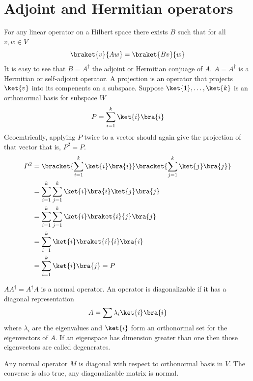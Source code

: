 \section{Adjoint and Hermitian operators}
For any linear operator on a Hilbert space there exists \(B\) such that for all \(v,w\in V\) 
\begin{equation*}
    \braket{v}{Aw} = \braket{Bv}{w}
\end{equation*}
It is easy to see that \(B = A^{\dagger}\) the adjoint or Hermitian conjuage of \(A\). \(A = A^{\dagger}\) is a Hermitian or self-adjoint operator. A projection is an operator that projects \(\ket{v}\) into its compenents on a subspace. Suppose \(\ket{1} , \dots , \ket{k}\) is an orthonormal basis for subspace \(W\) 
\begin{equation*}
    P = \sum_{i = 1}^k \ket{i} \bra{i}
\end{equation*}
Geoemtrically, applying \(P\) twice to a vector should again give the projection of that vector that is, \(P^2 = P\). 
\begin{align*}
    P^2 &=  \bracket{\sum_{i = 1}^k \ket{i} \bra{i}}  \bracket{\sum_{j = 1}^k \ket{j} \bra{j}}\\
    &=  \sum_{i = 1}^k  \sum_{j = 1}^k \ket{i} \bra{i} \ket{j} \bra{j} \\
    &=  \sum_{i = 1}^k  \sum_{j = 1}^k \ket{i} \braket{i}{j} \bra{j} \\
    &= \sum_{i = 1}^k \ket{i} \braket{i}{i} \bra{i} \\
    &=  \sum_{i = 1}^k  \ket{i}  \bra{j} = P
\end{align*} 

\(A A^{\dagger} = A^{\dagger} A\) is a normal operator. An operator is diagonalizable if it has a diagonal representation 
\begin{equation*}
    A = \sum \lambda_i \ket{i} \bra{i}
\end{equation*}
where \(\lambda_i\) are the eigenvalues and \(\ket{i}\) form an orthonormal set for the eigenvectors of \(A\). If an eigenspace has dimension greater than one then those eigenvectors are called degenerates.
\begin{theorem}
    Any normal operator \(M\) is diagonal with respect to orthonormal basis in \(V\). The converse is also true, any diagonalizable matrix is normal.
\end{theorem}

